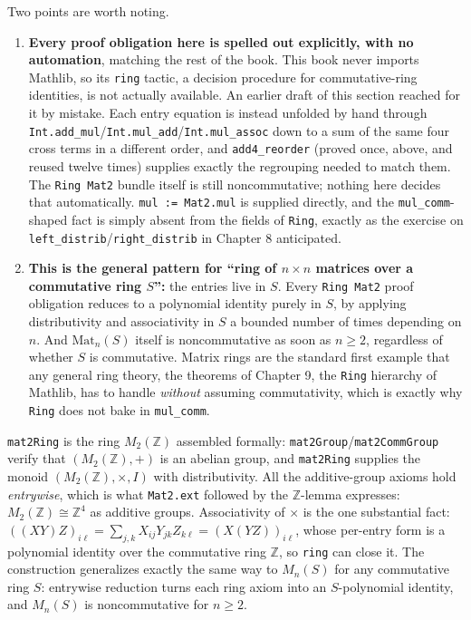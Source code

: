 Two points are worth noting.

\begin{enumerate}
\def\labelenumi{\arabic{enumi}.}
\tightlist
\item
  \textbf{Every proof obligation here is spelled out explicitly, with no automation}, matching the rest of the book. This book never imports Mathlib, so its \texttt{ring} tactic, a decision procedure for commutative-ring identities, is not actually available. An earlier draft of this section reached for it by mistake. Each entry equation is instead unfolded by hand through \texttt{Int.add\_\allowbreak{}mul}/\texttt{Int.mul\_\allowbreak{}add}/\texttt{Int.mul\_\allowbreak{}assoc} down to a sum of the same four cross terms in a different order, and \texttt{add4\_\allowbreak{}reorder} (proved once, above, and reused twelve times) supplies exactly the regrouping needed to match them. The \texttt{Ring Mat2} bundle itself is still noncommutative; nothing here decides that automatically. \texttt{mul := Mat2.mul} is supplied directly, and the \texttt{mul\_\allowbreak{}comm}-shaped fact is simply absent from the fields of \texttt{Ring}, exactly as the exercise on \texttt{left\_\allowbreak{}distrib}/\texttt{right\_\allowbreak{}distrib} in Chapter 8 anticipated.
\item
  \textbf{This is the general pattern for ``ring of \(n\times n\) matrices over a commutative ring \(S\)'':} the entries live in \(S\). Every \texttt{Ring Mat2} proof obligation reduces to a polynomial identity purely in \(S\), by applying distributivity and associativity in \(S\) a bounded number of times depending on \(n\). And \(\text{Mat}_n(S)\) itself is noncommutative as soon as \(n \geq 2\), regardless of whether \(S\) is commutative. Matrix rings are the standard first example that any general ring theory, the theorems of Chapter 9, the \texttt{Ring} hierarchy of Mathlib, has to handle \emph{without} assuming commutativity, which is exactly why \texttt{Ring} does not bake in \texttt{mul\_\allowbreak{}comm}.
\end{enumerate}

\begin{mathreading}

\texttt{mat2Ring} is the ring \(M_2(\mathbb{Z})\) assembled formally: \texttt{mat2Group}/\texttt{mat2CommGroup} verify that \((M_2(\mathbb{Z}), +)\) is an abelian group, and \texttt{mat2Ring} supplies the monoid \((M_2(\mathbb{Z}), \times, I)\) with distributivity. All the additive-group axioms hold \emph{entrywise}, which is what \texttt{Mat2.ext} followed by the \(\mathbb{Z}\)-lemma expresses: \(M_2(\mathbb{Z}) \cong \mathbb{Z}^4\) as additive groups. Associativity of \(\times\) is the one substantial fact: \(((XY)Z)_{i\ell} = \sum_{j,k} X_{ij}Y_{jk}Z_{k\ell} = (X(YZ))_{i\ell}\), whose per-entry form is a polynomial identity over the commutative ring \(\mathbb{Z}\), so \texttt{ring} can close it. The construction generalizes exactly the same way to \(M_n(S)\) for any commutative ring \(S\): entrywise reduction turns each ring axiom into an \(S\)-polynomial identity, and \(M_n(S)\) is noncommutative for \(n \ge 2\).

\end{mathreading}

